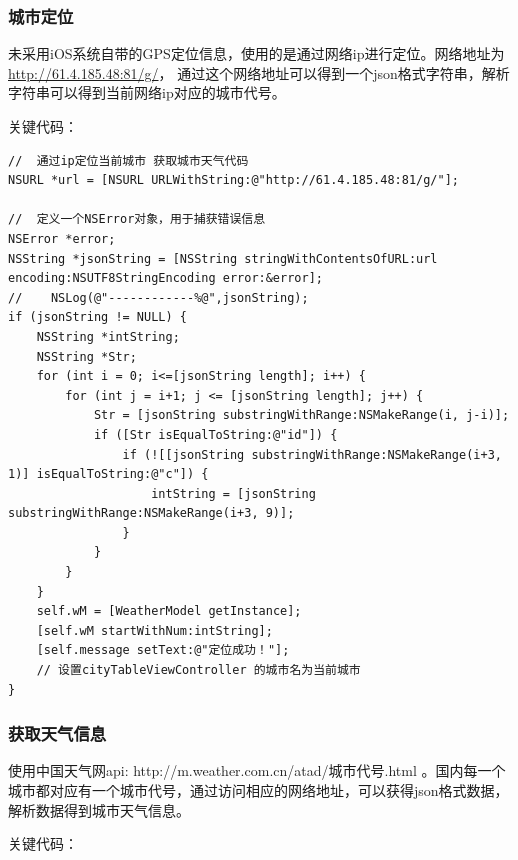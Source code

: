 \documentclass[UTF8,nofonts]{ctexart}
\begin{document}
\subsubsection{城市定位}

未采用iOS系统自带的GPS定位信息，使用的是通过网络ip进行定位。网络地址为 \url{http://61.4.185.48:81/g/}， 通过这个网络地址可以得到一个json格式字符串，解析字符串可以得到当前网络ip对应的城市代号。

\newpage
关键代码：

\begin{lstlisting}[language={[ANSI]C++}]
//	通过ip定位当前城市 获取城市天气代码
NSURL *url = [NSURL URLWithString:@"http://61.4.185.48:81/g/"];

//	定义一个NSError对象，用于捕获错误信息
NSError *error;
NSString *jsonString = [NSString stringWithContentsOfURL:url encoding:NSUTF8StringEncoding error:&error];
//    NSLog(@"------------%@",jsonString);
if (jsonString != NULL) {
    NSString *intString;
    NSString *Str;
    for (int i = 0; i<=[jsonString length]; i++) {
        for (int j = i+1; j <= [jsonString length]; j++) {
            Str = [jsonString substringWithRange:NSMakeRange(i, j-i)];
            if ([Str isEqualToString:@"id"]) {
                if (![[jsonString substringWithRange:NSMakeRange(i+3, 1)] isEqualToString:@"c"]) {
                    intString = [jsonString substringWithRange:NSMakeRange(i+3, 9)];
                }
            }
        }
    }
    self.wM = [WeatherModel getInstance];
    [self.wM startWithNum:intString];
    [self.message setText:@"定位成功！"];
    // 设置cityTableViewController 的城市名为当前城市
}
\end{lstlisting}

\subsubsection{获取天气信息}
使用中国天气网api: http://m.weather.com.cn/atad/城市代号.html 。国内每一个城市都对应有一个城市代号，通过访问相应的网络地址，可以获得json格式数据，解析数据得到城市天气信息。

关键代码：
\end{document}
